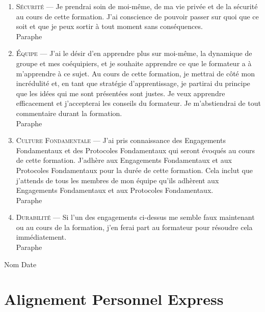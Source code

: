 \documentclass[paper=6in:9in,pagesize=pdftex,headinclude=on,footinclude=on,12pt]{scrbook}
\begin{document}
\begin{enumerate}
	\item \textsc{Sécurité} --- Je prendrai soin de moi-même, de ma vie privée et de la sécurité au cours de cette formation. J'ai conscience de pouvoir passer sur quoi
	      que ce soit et que je peux sortir à tout moment sans conséquences.\\[1em]\nobreak
	      Paraphe  \dotfill
	      \vspace{\fill}
	\item \textsc{Équipe} --- J'ai le désir d'en apprendre plus sur moi-même, la dynamique de groupe et mes coéquipiers, et je souhaite apprendre ce que
	      le formateur a à m'apprendre à ce sujet. Au cours de cette formation, je mettrai de côté mon incrédulité et, en tant que stratégie d'apprentissage,
	      je partirai du principe que les idées qui me sont présentées sont justes. Je veux apprendre efficacement et j'accepterai les conseils du formateur.
	      Je m'abstiendrai de tout commentaire durant la formation.\\[1em]\nobreak
	      Paraphe  \dotfill
	      \vspace{\fill}
	\item \textsc{Culture Fondamentale} --- J'ai pris connaissance des Engagements Fondamentaux et des Protocoles Fondamentaux qui seront évoqués au cours
	      de cette formation. J'ad\-hère aux Engagements Fondamentaux et aux Protocoles Fondamentaux pour la durée de cette formation. Cela inclut que j'attends
	      de tous les membres de mon équipe qu'ils adhèrent aux Engagements Fondamentaux et aux Protocoles Fondamentaux.\\[1em]\nobreak
	      Paraphe  \dotfill
	      \vspace{\fill}
	\item \textsc{Durabilité} --- Si l'un des engagements ci-dessus me semble faux maintenant ou au cours de la formation, j'en ferai part au formateur
	      pour résoudre cela immédiatement. \\[1em]\nobreak
	      Paraphe  \dotfill
	      \vspace{\fill}
\end{enumerate}

\vfill

Nom \dotfill Date \dotfill

\section{Alignement Personnel Express} \label{alignement-personnel-express}
\end{document}
